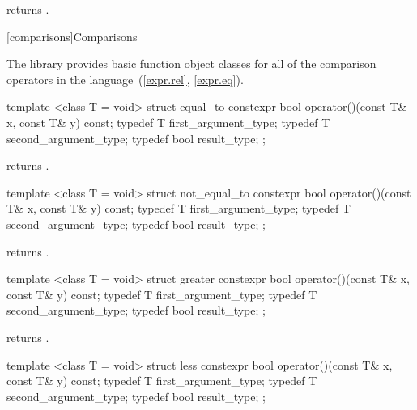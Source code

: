 \begin{itemdescr}
\pnum
{} returns .
\end{itemdescr}


[comparisons]{Comparisons}

\pnum
The library provides basic function object classes for all of the comparison
operators in the language~(\ref{expr.rel}, \ref{expr.eq}).

%
\begin{itemdecl}
template <class T = void> struct equal_to {
  constexpr bool operator()(const T& x, const T& y) const;
  typedef T first_argument_type;
  typedef T second_argument_type;
  typedef bool result_type;
};
\end{itemdecl}

\begin{itemdescr}
\pnum
{} returns .
\end{itemdescr}

%
\begin{itemdecl}
template <class T = void> struct not_equal_to {
  constexpr bool operator()(const T& x, const T& y) const;
  typedef T first_argument_type;
  typedef T second_argument_type;
  typedef bool result_type;
};
\end{itemdecl}

\begin{itemdescr}
\pnum
{} returns .
\end{itemdescr}

%
\begin{itemdecl}
template <class T = void> struct greater {
  constexpr bool operator()(const T& x, const T& y) const;
  typedef T first_argument_type;
  typedef T second_argument_type;
  typedef bool result_type;
};
\end{itemdecl}

\begin{itemdescr}
\pnum
{} returns .
\end{itemdescr}

%
\begin{itemdecl}
template <class T = void> struct less {
  constexpr bool operator()(const T& x, const T& y) const;
  typedef T first_argument_type;
  typedef T second_argument_type;
  typedef bool result_type;
};
\end{itemdecl}

